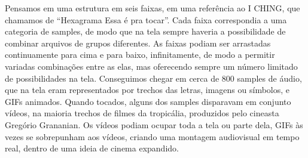 
Pensamos em uma estrutura em seis faixas, em uma referência ao I CHING, que chamamos de ``Hexagrama Essa é pra tocar''.  Cada faixa correspondia a uma categoria de samples, de modo que na tela sempre haveria a possibilidade de combinar arquivos de grupos diferentes. As faixas podiam ser arrastadas continuamente para cima e para baixo, infinitamente, de modo a permitir variadas combinações entre as elas, mas oferecendo sempre um número limitado de possibilidades na tela. Conseguimos chegar em cerca de 800 samples de áudio, que na tela eram representados por trechos das letras, imagens ou símbolos, e GIFs animados. Quando tocados, alguns dos samples disparavam em conjunto vídeos, na maioria trechos de filmes da tropicália, produzidos pelo cineasta Gregório Grananian. Os vídeos podiam ocupar toda a tela ou parte dela, GIFs às vezes se sobrepunham aos vídeos, criando uma montagem audiovisual em tempo real, dentro de uma ideia de cinema expandido.  


